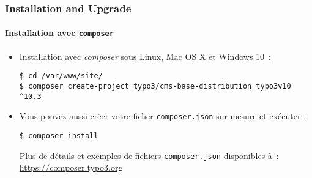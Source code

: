 
\begin{frame}[fragile]
	\frametitle{Installation and Upgrade}
	\framesubtitle{Installation avec \texttt{composer}}

	\begin{itemize}
		\item Installation avec \textit{composer} sous Linux, Mac OS X et Windows 10~:
\begin{lstlisting}
$ cd /var/www/site/
$ composer create-project typo3/cms-base-distribution typo3v10 ^10.3
\end{lstlisting}

		\item Vous pouvez aussi créer votre ficher \texttt{composer.json} sur mesure
			et exécuter~:
\begin{lstlisting}
$ composer install
\end{lstlisting}

			Plus de détails et exemples de fichiers \texttt{composer.json} disponibles à~:\newline
			\smaller
				\href{https://composer.typo3.org}{https://composer.typo3.org}
			\normalsize

	\end{itemize}
\end{frame}

